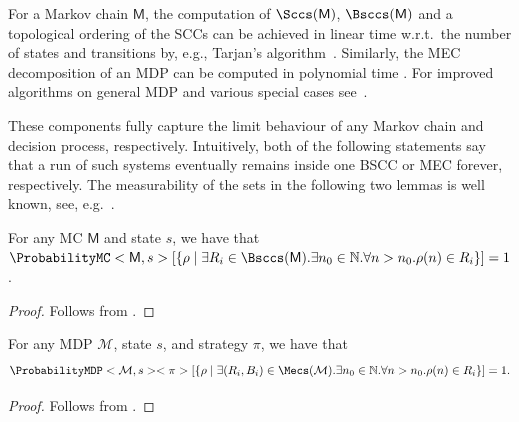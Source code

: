 \documentclass{theoretics}
\newcommand{\Naturals}{\mathbb{N}}
\newcommand{\MC}{\mathsf{M}}
\newcommand{\MDP}{\mathcal{M}}
\newcommand{\infinitepath}{\rho}
\newcommand{\strategy}{\pi}
\begin{document}
\begin{remark} \label{rem:scc_and_mec_decomposition}
	For a Markov chain $\MC$, the computation of $\Sccs(\MC)$, $\Bsccs(\MC)$ and a topological ordering of the SCCs can be achieved in linear time w.r.t.\ the number of states and transitions by, e.g., Tarjan's algorithm~\cite{DBLP:journals/siamcomp/Tarjan72}.
	Similarly, the MEC decomposition of an MDP can be computed in polynomial time \cite{DBLP:journals/jacm/CourcoubetisY95}.
	For improved algorithms on general MDP and various special cases see~\cite{DBLP:conf/soda/ChatterjeeH11,DBLP:conf/soda/ChatterjeeH12,DBLP:journals/jacm/ChatterjeeH14}.
\end{remark}
These components fully capture the limit behaviour of any Markov chain and decision process, respectively.
Intuitively, both of the following statements say that a run of such systems eventually remains inside one BSCC or MEC forever, respectively.
The measurability of the sets in the following two lemmas is well known, see, e.g.\ \cite[Chapter~10]{DBLP:books/daglib/0020348}.
\begin{lemma} \label{stm:mc_almost_sure_absorption}
	For any MC $\MC$ and state $s$, we have that $\ProbabilityMC<\MC, s>[\{\infinitepath \mid \exists R_i \in \Bsccs(\MC). \exists n_0 \in \Naturals. \forall n > n_0. \infinitepath(n) \in R_i\}] = 1$.
\end{lemma}
\begin{proof}
	Follows from \cite[Theorem~10.27]{DBLP:books/daglib/0020348}. 
\end{proof}
\begin{lemma} \label{stm:mdp_almost_sure_absorption}
	For any MDP $\MDP$, state $s$, and strategy $\strategy$, we have that 
	\begin{equation*}
		\ProbabilityMDP<\MDP, s><\strategy>[\{\infinitepath \mid \exists (R_i, B_i) \in \Mecs(\MDP). \exists n_0 \in \Naturals. \forall n > n_0. \infinitepath(n) \in R_i\}] = 1.
	\end{equation*}
\end{lemma}
\begin{proof}
	Follows from \cite[Theorem~3.2]{de1997formal}. 
\end{proof}
\end{document}

